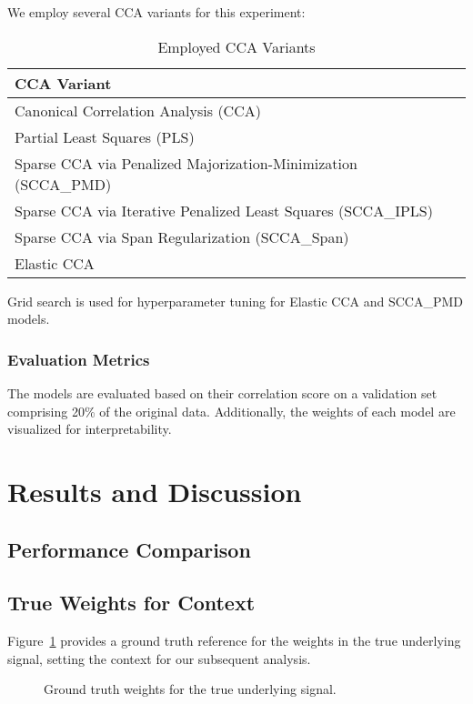We employ several CCA variants for this experiment:

\begin{table}[h]
\centering
\caption{Employed CCA Variants}
\begin{tabular}{l}
\textbf{CCA Variant} \\
\hline
Canonical Correlation Analysis (CCA) \\
Partial Least Squares (PLS) \\
Sparse CCA via Penalized Majorization-Minimization (SCCA\_PMD) \\
Sparse CCA via Iterative Penalized Least Squares (SCCA\_IPLS) \\
Sparse CCA via Span Regularization (SCCA\_Span) \\
Elastic CCA \\
\end{tabular}
\label{table:cca-variants}
\end{table}

Grid search is used for hyperparameter tuning for Elastic CCA and SCCA\_PMD models.

\subsubsection{Evaluation Metrics}

The models are evaluated based on their correlation score on a validation set comprising 20\% of the original data. Additionally, the weights of each model are visualized for interpretability.

\section{Results and Discussion}

\subsection{Performance Comparison}

\subsection{True Weights for Context}

Figure~\ref{fig:True_weights} provides a ground truth reference for the weights in the true underlying signal, setting the context for our subsequent analysis.

\begin{figure}[h]
    \centering
    
    \caption{Ground truth weights for the true underlying signal.}
    \label{fig:True_weights}
\end{figure}

